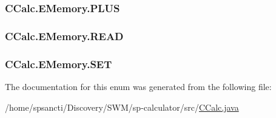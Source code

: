 \subsubsection[{\texorpdfstring{P\+L\+US}{PLUS}}]{\setlength{\rightskip}{0pt plus 5cm}C\+Calc.\+E\+Memory.\+P\+L\+US}\hypertarget{enum_c_calc_1_1_e_memory_a670fd8f9c016945af42b1eb328227d1d}{}\label{enum_c_calc_1_1_e_memory_a670fd8f9c016945af42b1eb328227d1d}
\subsubsection[{\texorpdfstring{R\+E\+AD}{READ}}]{\setlength{\rightskip}{0pt plus 5cm}C\+Calc.\+E\+Memory.\+R\+E\+AD}\hypertarget{enum_c_calc_1_1_e_memory_a5a35ec9df2568ed891a4dd1e94350f63}{}\label{enum_c_calc_1_1_e_memory_a5a35ec9df2568ed891a4dd1e94350f63}
\subsubsection[{\texorpdfstring{S\+ET}{SET}}]{\setlength{\rightskip}{0pt plus 5cm}C\+Calc.\+E\+Memory.\+S\+ET}\hypertarget{enum_c_calc_1_1_e_memory_a60c0f6a1e290b2746e1c29ac9cda4bfe}{}\label{enum_c_calc_1_1_e_memory_a60c0f6a1e290b2746e1c29ac9cda4bfe}


The documentation for this enum was generated from the following file\+:\begin{DoxyCompactItemize}
\item 
/home/spsancti/\+Discovery/\+S\+W\+M/sp-\/calculator/src/\hyperlink{_c_calc_8java}{C\+Calc.\+java}\end{DoxyCompactItemize}
